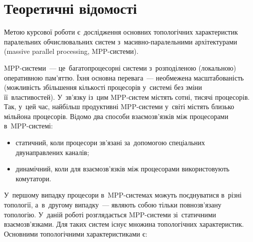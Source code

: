 \documentclass[
	a4paper,
	oneside,
	BCOR = 10mm,
	DIV = 12,
	12pt,
	headings = normal,
]{scrartcl}
\begin{document}
	\section{Теоретичні відомості}
		Метою курсової роботи є~дослідження основних топологічних характеристик паралельних обчислювальних систем з~масивно-паралельними архітектурами (\textenglish{massive parallel processing}, \textenglish{MPP}-системи).

		\textenglish{MPP}-системи~— це~багатопроцесорні системи з~розподіленою (локальною) оперативною пам'яттю. Їхня основна перевага~— необмежена масштабованість (можливість збільшення кількості процесорів у~системі без зміни її~властивостей). У~зв'язку із~цим \textenglish{MPP}-систем містять сотні, тисячі процесорів. Так, у~цей час, найбільш продуктивні \textenglish{MPP}-системи у~світі містять близько мільйона процесорів. Відомо два способи взаємозв'язків між процесорами в~\textenglish{MPP}-системі:
		\begin{itemize}
			\item статичний, коли процесори зв'язані за~допомогою спеціальних двунаправлених каналів;
			\item динамічний, коли для взаємозв'язків між процесорами використовують комутатори.
		\end{itemize}
		У~першому випадку процесори в~\textenglish{MPP}-системах можуть поєднуватися в~різні топології, а~в~другому випадку~— являють собою тільки повнозв’язану топологію.
		У~даній роботі розглядається \textenglish{MPP}-системи зі~статичними взаємозв'язками. Для таких систем існує множина топологічних характеристик. Основними топологічними характеристиками є: 
\end{document}
